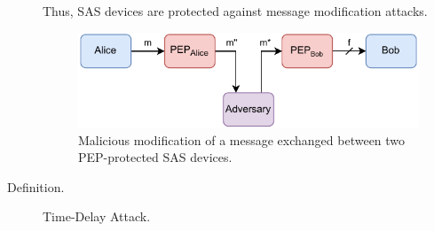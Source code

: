 \begin{description}
    Thus, SAS devices are protected against message modification attacks.
    \begin{figure}
        \centering
        \includegraphics[width=0.75\linewidth]{figures/attack_message_modification.drawio.pdf}
        \caption{Malicious modification of a message exchanged between two PEP-protected SAS devices.}
        \label{fig:attack_message_modification}
    \end{figure}

    \item[Definition.] Time-Delay Attack.\\


\end{description}
